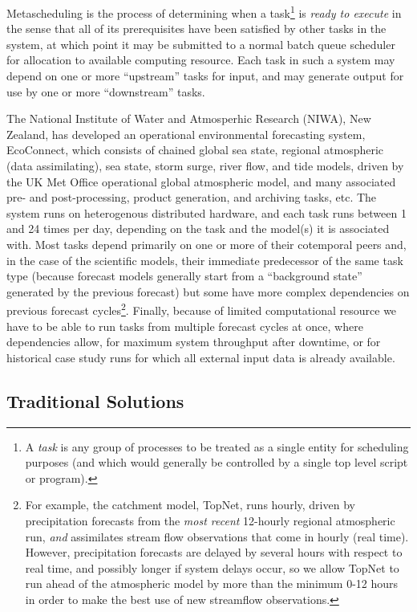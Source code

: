\documentclass[11pt,a4paper]{article}
\begin{document}
Metascheduling is the process of determining when a task\footnote{A {\em
task} is any group of processes to be treated as a single entity for
scheduling purposes (and which would generally be controlled by a single
top level script or program).} is {\em ready to execute} in the sense
that all of its prerequisites have been satisfied by other tasks in the
system, at which point it may be submitted to a normal batch queue
scheduler for allocation to available computing resource. Each task in
such a system may depend on one or more ``upstream'' tasks for input,
and may generate output for use by one or more ``downstream'' tasks.

The National Institute of Water and Atmosperhic Research (NIWA), New
Zealand, has developed an operational environmental forecasting system,
EcoConnect, which consists of chained global sea state, regional
atmospheric (data assimilating), sea state, storm surge, river flow, and
tide models, driven by the UK Met Office operational global atmospheric
model, and many associated pre- and post-processing, product generation,
and archiving tasks, etc. The system runs on heterogenous distributed
hardware, and each task runs between 1 and 24 times per day, depending
on the task and the model(s) it is associated with. Most tasks depend
primarily on one or more of their cotemporal peers and, in the case of
the scientific models, their immediate predecessor of the same task type
(because forecast models generally start from a ``background state''
generated by the previous forecast) but some have more complex
dependencies on previous forecast cycles\footnote{For example, the
catchment model, TopNet, runs hourly, driven by precipitation forecasts
from the {\em most recent} 12-hourly regional atmospheric run, {\em and}
assimilates stream flow observations that come in hourly (real time).
However, precipitation forecasts are delayed by several hours with
respect to real time, and possibly longer if system delays occur, so we
allow TopNet to run ahead of the atmospheric model by more than the
minimum 0-12 hours in order to make the best use of new streamflow
observations.}.  Finally, because of limited computational resource we
have to be able to run tasks from multiple forecast cycles at once,
where dependencies allow, for maximum system throughput after downtime,
or for historical case study runs for which all external input data is
already available.

\subsection{Traditional Solutions}
\end{document}
